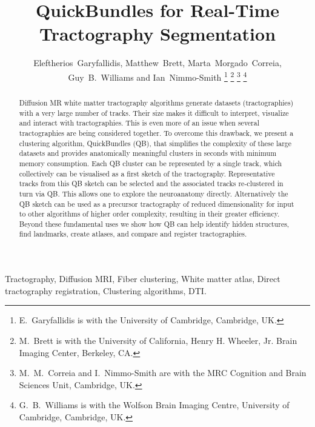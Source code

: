 \documentclass[journal]{IEEEtran}
\begin{document}

\title{QuickBundles for Real-Time Tractography Segmentation}

\author{Eleftherios~Garyfallidis, Matthew~Brett, Marta~Morgado~Correia, Guy~B.~Williams and Ian~Nimmo-Smith%
\thanks{E.~Garyfallidis is with the University of Cambridge, Cambridge, UK.}%
\thanks{M.~Brett is with the University of California, Henry H. Wheeler, Jr. Brain Imaging Center, Berkeley, CA.}%
\thanks{M.~M.~Correia and I.~Nimmo-Smith are with the MRC Cognition and Brain Sciences Unit, Cambridge, UK.}%
\thanks{G.~B.~Williams is with the Wolfson Brain Imaging Centre, University of Cambridge, Cambridge, UK.}}



\maketitle

\begin{abstract}
  Diffusion MR white matter tractography algorithms generate datasets
  (tractographies) with a very large number of tracks. Their size makes
  it difficult to interpret, visualize and interact with
  tractographies. This is even more of an issue when several
  tractographies are being considered together. To overcome this
  drawback, we present a clustering algorithm, QuickBundles (QB), that
  simplifies the complexity of these large datasets and provides
  anatomically meaningful clusters in seconds with minimum memory
  consumption. Each QB cluster can be represented by a single track,
  which collectively can be visualised as a first sketch of the
  tractography.  Representative tracks from this QB sketch can be
  selected and the associated tracks re-clustered in turn via QB. This
  allows one to explore the neuroanatomy directly. Alternatively the QB
  sketch can be used as a precursor tractography of reduced
  dimensionality for input to other algorithms of higher order
  complexity, resulting in their greater efficiency. Beyond these
  fundamental uses we show how QB can help identify hidden structures,
  find landmarks, create atlases, and compare and register
  tractographies.
\end{abstract}

\begin{IEEEkeywords}
Tractography, Diffusion MRI, Fiber clustering, White matter atlas, Direct tractography registration, Clustering algorithms, DTI.
\end{IEEEkeywords}
\end{document}
